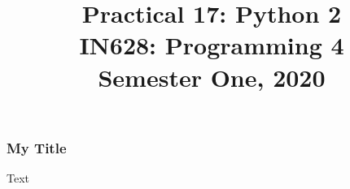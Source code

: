 \documentclass[10pt]{beamer}
\author{}
\title{Practical 17: Python 2\\IN628: Programming 4\\Semester One, 2020}
\institute{Otago Polytechnic, Dunedin, New Zealand}
\date{}
\begin{document}
\begin{frame}
	\titlepage
\end{frame}

\begin{frame}
	\frametitle{My Title} 
	Text
\end{frame}
  
\end{document}
